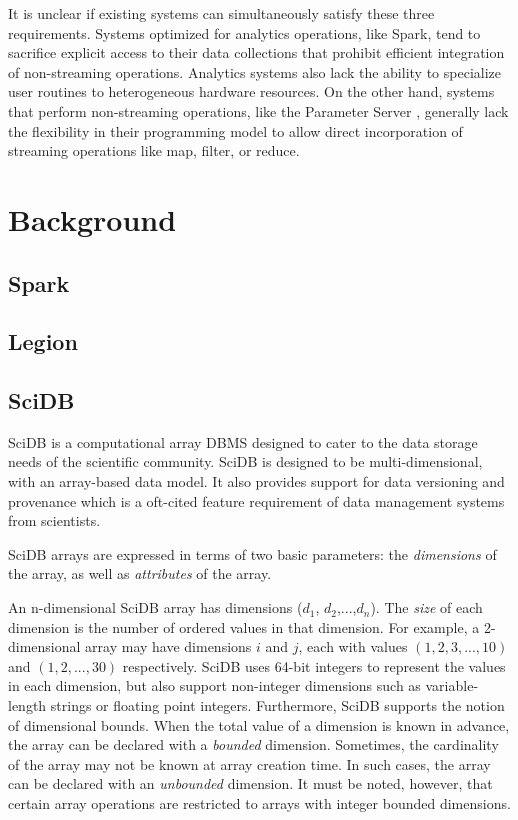 \documentclass[tog]{acmsiggraph}
\begin{document}
It is unclear if existing systems can simultaneously satisfy these three
requirements. Systems optimized for analytics operations, like Spark, tend to
sacrifice explicit access to their data collections that prohibit efficient
integration of non-streaming operations. Analytics systems also lack the
ability to specialize user routines to heterogeneous hardware resources. On the
other hand, systems that perform non-streaming operations, like the Parameter
Server \cite{li2014scaling}, generally lack the flexibility in their
programming model to allow direct incorporation of streaming operations like
map, filter, or reduce.

\section{Background}

\subsection{Spark}

\subsection{Legion}

\subsection{SciDB}
SciDB\cite{stonebraker2013scidb} is a computational array DBMS designed to cater to the data storage needs of the scientific community. SciDB is designed to be multi-dimensional, with an array-based data model. It also provides support for data versioning and provenance which is a oft-cited feature requirement of data management systems from scientists.

SciDB arrays are expressed in terms of two basic parameters:  the {\em dimensions} of the array, as well as {\em attributes} of the array. 

An n-dimensional SciDB array has dimensions ($d_{1}$, $d_{2}$,$...$,$d_{n}$). The {\em size} of each dimension is the number of ordered values in that dimension. For example, a 2-dimensional array may have dimensions $i$ and $j$, each with values $(1, 2, 3, ..., 10)$ and $(1, 2, ..., 30)$ respectively. SciDB uses 64-bit integers to represent the values in each dimension, but also support non-integer dimensions such as variable-length strings or floating point integers. Furthermore, SciDB supports the notion of dimensional bounds. When the total value of a dimension is known in advance, the array can be declared with a {\em bounded} dimension. Sometimes, the cardinality of the array may not be known at array creation time. In such cases, the array can be declared with an {\em unbounded} dimension. It must be noted, however, that certain array operations are restricted to arrays with integer bounded dimensions.
\end{document}
